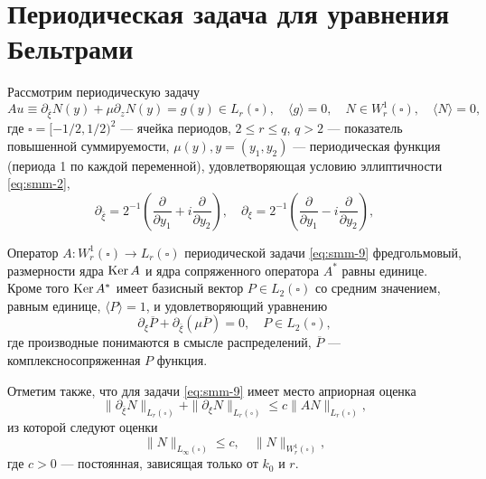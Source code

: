 \section{Периодическая задача для уравнения Бельтрами}
Рассмотрим периодическую задачу
\begin{equation}\label{eq:smm-9}
Au\equiv\partial_{\bar{\xi}}N(y)+\mu\partial_z N(y)=g(y)\in L_r(\square) ,\quad  \langle g\rangle=0, \quad N\in W_r^1(\square), \quad \langle N\rangle=0,
\end{equation} 
	где $\square=[-1/2, 1/2)^2$ --- ячейка периодов, $2\leqslant r\leqslant q$, $q>2$ --- показатель повышенной суммируемости, $\mu(y),y=(y_1,y_2 )$ --- периодическая функция (периода 1 по каждой переменной), удовлетворяющая условию эллиптичности \eqref{eq:smm-2},
$$
\partial_{\bar{\xi}}=2^{-1}\left(\frac{\partial}{\partial y_1}+i\frac{\partial}{\partial y_2}\right),\quad \partial_{\xi}=2^{-1}\left(\frac{\partial}{\partial y_1}-i\frac{\partial}{\partial y_2}\right),
$$
\begin{theorem}\label{th:smm-3}
	Оператор $A:W_r^1(\square)\to L_r(\square) $ периодической  задачи  \eqref{eq:smm-9}  фредгольмовый, размерности ядра  $\text{\rm Ker}\,A$  и ядра сопряженного оператора $A^\ast$ равны единице. Кроме того $\text{\rm Ker}\,A^\ast$ имеет базисный вектор $P\in L_2(\square)$ со средним значением, равным единице, $\langle P\rangle=1$, и удовлетворяющий уравнению
	$$
	\partial_\xi\overline{P}+\partial_{\bar\xi}(\mu\overline{P})=0,\quad P\in L_2(\square),                                
	$$
	где производные понимаются в смысле распределений, $\overline{P}$ --- комплексносопряженная $P$ функция.
\end{theorem}

Отметим также, что для задачи \eqref{eq:smm-9} имеет место априорная оценка 
$$
\|\partial_{\bar\xi} N\|_{L_r(\square) }+\|\partial_{\xi} N\|_{L_r(\square) }  \leqslant
c\|AN\|_{L_r(\square)},
$$   
из которой следуют оценки
$$
\|N\|_{L_\infty(\square)}\leqslant c, \quad \|N\|_{W_r^1(\square)},
$$         
где $c>0$ --- постоянная, зависящая только от $k_0$ и $r$.


